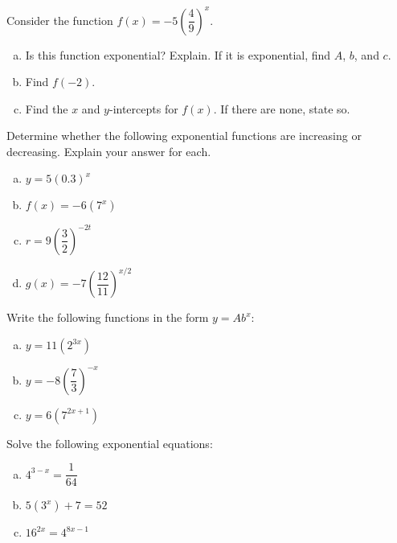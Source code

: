 \documentclass[11pt,letterpaper]{article}
\begin{document}

 Consider the function $f(x)= -5 \left( \dfrac{4}{9} \right)^x$. 
	\begin{enumerate}[(a)]
	\item Is this function exponential? Explain. If it is exponential, find $A$, $b$, and $c$.
	\item Find $f(-2)$. 
	\item Find the $x$ and $y$-intercepts for $f(x)$. If there are none, state so. 
	\end{enumerate} 



\newpage



 Determine whether the following exponential functions are increasing or decreasing. Explain your answer for each.
	\begin{enumerate}[(a)]
	\item $y= 5(0.3)^x$
	\item $f(x)= -6(7^x)$
	\item $r= 9 \left(\dfrac{3}{2} \right)^{-2t}$
	\item $g(x)= -7 \left( \dfrac{12}{11} \right)^{x/2}$
	\end{enumerate}



\newpage



 Write the following functions in the form $y= Ab^x$:
	\begin{enumerate}[(a)]
	\item $y= 11(2^{3x})$
	\item $y= -8 \left( \dfrac{7}{3} \right)^{-x}$
	\item $y= 6 (7^{2x + 1})$
	\end{enumerate}



\newpage



 Solve the following exponential equations:
	\begin{enumerate}[(a)]
	\item $4^{3-x}= \dfrac{1}{64}$
	\item $5(3^x) + 7= 52$
	\item $16^{2x}= 4^{8x - 1}$
	\end{enumerate}
\end{document}

